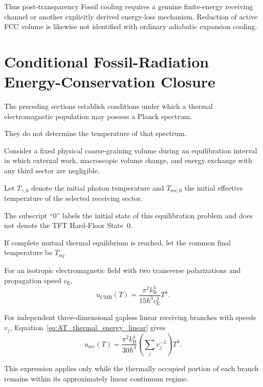 Thus post-transparency Fossil cooling requires a genuine finite-energy
receiving channel or another explicitly derived energy-loss mechanism.
Reduction of active FCC volume is likewise not identified with ordinary
adiabatic expansion cooling.

\section{Conditional Fossil-Radiation Energy-Conservation Closure}

The preceding sections establish conditions under which a thermal
electromagnetic population may possess a Planck spectrum.

They do not determine the temperature of that spectrum.

Consider a fixed physical coarse-graining volume during an equilibration
interval in which external work, macroscopic volume change, and energy
exchange with any third sector are negligible.

Let
\(T_{\gamma,0}\)
denote the initial photon temperature and
\(T_{\mathrm{rec},0}\)
the initial effective temperature of the selected receiving sector.

The subscript ``0'' labels the initial state of this equilibration problem and
does not denote the TFT Hard-Floor State~0.

If complete mutual thermal equilibrium is reached, let the common final
temperature be
\(T_{\mathrm{eq}}\).

For an isotropic electromagnetic field with two transverse polarizations and
propagation speed
\(c_{\mathrm E}\),
\begin{equation}
    u_{\mathrm{CMB}}(T)
    =
    \frac{
        \pi^2k_{\mathrm B}^4
    }{
        15\hbar^3c_{\mathrm E}^3
    }
    T^4.
    \label{eq:AT_CMB_energy_density}
\end{equation}

For independent three-dimensional gapless linear receiving branches with
speeds
\(v_j\),
Equation~\eqref{eq:AT_thermal_energy_linear}
gives
\begin{equation}
    u_{\mathrm{rec}}(T)
    =
    \frac{
        \pi^2k_{\mathrm B}^4
    }{
        30\hbar^3
    }
    \left(
        \sum_j v_j^{-3}
    \right)
    T^4.
    \label{eq:AT_receiver_energy_density}
\end{equation}

This expression applies only while the thermally occupied portion of each
branch remains within its approximately linear continuum regime.

